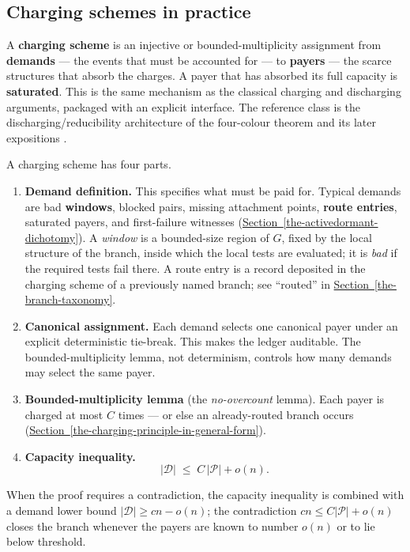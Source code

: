\documentclass[
  11pt,
]{article}
\providecommand{\tightlist}{%
  \setlength{\itemsep}{0pt}\setlength{\parskip}{0pt}}
\theoremstyle{definition}
\newcommand{\secref}[1]{\hyperref[#1]{Section~\ref*{#1}}}
\begin{document}
\subsection*{Charging schemes in practice}

A \textbf{charging scheme} is an injective or bounded-multiplicity
assignment from \textbf{demands} --- the events that must be accounted
for --- to \textbf{payers} --- the scarce structures that absorb the
charges. A payer that has absorbed its full capacity is
\textbf{saturated}. This is the same mechanism as the classical charging
and discharging arguments, packaged with an explicit interface. The
reference class is the discharging/reducibility architecture of the
four-colour theorem and its later expositions
\citep{appel-haken-1977-discharging, appel-haken-koch-1977-reducibility, robertson-etal-1997-four-colour, cranston-west-2017-discharging}.

A charging scheme has four parts.

\begin{enumerate}
\def\labelenumi{\arabic{enumi}.}
\tightlist
\item
  \textbf{Demand definition.} This specifies what must be paid for.
  Typical demands are bad \textbf{windows}, blocked pairs, missing
  attachment points, \textbf{route entries}, saturated payers, and
  first-failure witnesses (\secref{the-activedormant-dichotomy}). A \emph{window} is a bounded-size
  region of \(G\), fixed by the local structure of the branch, inside
  which the local tests are evaluated; it is \emph{bad} if the required
  tests fail there. A route entry is a record deposited in the charging
  scheme of a previously named branch; see ``routed'' in \secref{the-branch-taxonomy}.
\item
  \textbf{Canonical assignment.} Each demand selects one canonical payer
  under an explicit deterministic tie-break. This makes the ledger
  auditable. The bounded-multiplicity lemma, not determinism, controls how
  many demands may select the same payer.
\item
  \textbf{Bounded-multiplicity lemma} (the \emph{no-overcount} lemma).
  Each payer is charged at most \(C\) times --- or else an
  already-routed branch occurs (\secref{the-charging-principle-in-general-form}).
\item
  \textbf{Capacity inequality.} \[
  |\mathcal D| \;\le\; C\,|\mathcal P| + o(n).
  \]
\end{enumerate}

When the proof requires a contradiction, the capacity inequality is
combined with a demand lower bound \(|\mathcal D|\ge cn - o(n)\); the
contradiction \(cn \le C|\mathcal P| + o(n)\) closes the branch whenever
the payers are known to number \(o(n)\) or to lie below threshold.
\end{document}

